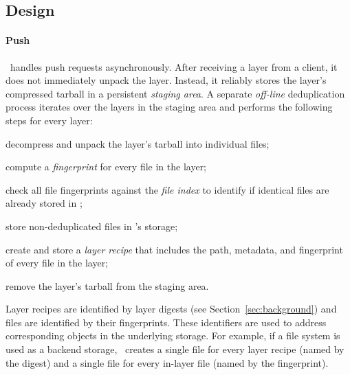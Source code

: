 \subsection{Design}
\label{sec:design}

%

%
%
%

\paragraph{Push}
%
\sysname\ handles push requests asynchronously.
%
After receiving a layer from a client, it does not immediately unpack the layer.
%
Instead, it reliably stores the layer's compressed tarball in a persistent
\emph{staging area}.
%
A separate \emph{off-line} deduplication process iterates over the layers in
the staging area and performs the following steps for every layer:
%
\begin{compactenumerate}
  \item decompress and unpack the layer's tarball into individual files;
  \item compute a \emph{fingerprint} for every file in the layer;
  \item check all file fingerprints against the \emph{file index} to
	identify if identical files are already stored in \sysname;
  \item store non-deduplicated files in \sysname's storage;
  \item create and store a \emph{layer recipe} that includes the path,
	metadata, and fingerprint of every file in the layer;
  \item remove the layer's tarball from the staging area.
\end{compactenumerate}

%
%
Layer recipes are identified by layer digests (see Section~\ref{sec:background})
and files are identified by their fingerprints.
%
These identifiers are used to address corresponding objects in the
underlying storage.
%
For example, if a file system is used as a backend storage, \sysname\ creates a
single file for every layer recipe (named by the digest) and a single file for
every in-layer file (named by the fingerprint).


